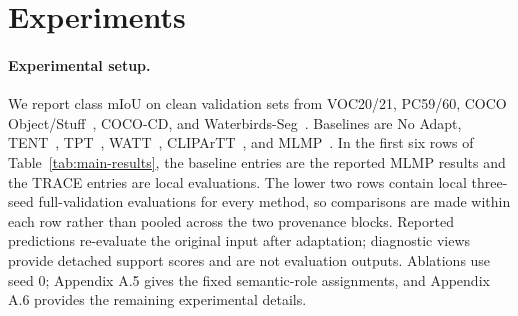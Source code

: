 \documentclass[letterpaper]{article}
\newcommand{\method}{TRACE\xspace}
\begin{document}
	
	\section{Experiments}
	
	\paragraph{Experimental setup.}
	
	We report class mIoU on clean validation sets from VOC20/21, PC59/60, COCO Object/Stuff~\cite{everingham2015pascal,mottaghi2014context,lin2014coco,caesar2018cocostuff}, COCO-CD, and Waterbirds-Seg~\cite{achara2026rightregions,sagawa2020dro}. Baselines are No Adapt, TENT~\cite{wang2021tent}, TPT~\cite{shu2022tpt}, WATT~\cite{osowiechi2024watt}, CLIPArTT~\cite{hakim2025clipartt}, and MLMP~\cite{noori2025mlmp}. In the first six rows of Table~\ref{tab:main-results}, the baseline entries are the reported MLMP results and the \method entries are local evaluations. The lower two rows contain local three-seed full-validation evaluations for every method, so comparisons are made within each row rather than pooled across the two provenance blocks. Reported predictions re-evaluate the original input after adaptation; diagnostic views provide detached support scores and are not evaluation outputs. Ablations use seed 0; Appendix A.5 gives the fixed semantic-role assignments, and Appendix A.6 provides the remaining experimental details.
	
\end{document}
